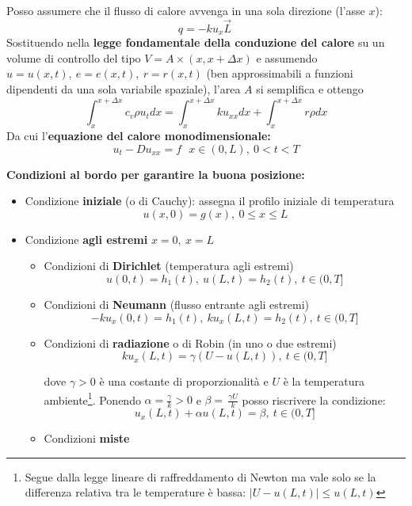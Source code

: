 \documentclass[10pt,a4paper,twoside,openright]{book}
\begin{document}
Posso assumere che il flusso di calore avvenga in una sola direzione (l'asse $\displaystyle x$):
\begin{equation*}
q=-ku_{x}\vec{L} \ 
\end{equation*}
Sostituendo nella \textbf{legge fondamentale della conduzione del calore} su un volume di controllo del tipo $\displaystyle V=A\times (x,x+\Delta x)$ e assumendo $\displaystyle u=u(x,t),\ e=e(x,t),\ r=r(x,t)$ (ben approssimabili a funzioni dipendenti da una sola variabile spaziale), l'area $\displaystyle A$ si semplifica e ottengo
\begin{equation*}
\int ^{x+\Delta x}_{x} c_{v} \rho u_{t} dx=\int ^{x+\Delta x}_{x} ku_{xx} dx+\int ^{x+\Delta x}_{x} r\rho dx
\end{equation*}
Da cui l'\textbf{equazione del calore monodimensionale:}
\begin{equation*}
\boxed{u_{t} -Du_{xx} =f} \ \ \ x\in (0,L),\ 0< t< T
\end{equation*}


\textbf{Condizioni al bordo per garantire la buona posizione:}
\begin{itemize}
\item Condizione \textbf{iniziale} (o di Cauchy): assegna il profilo iniziale di temperatura\begin{equation*}
u(x,0) =g(x),\ 0\leqslant x\leqslant L
\end{equation*}
\item Condizione \textbf{agli estremi} $\displaystyle x=0,\ x=L$
\begin{itemize}
\item Condizioni di \textbf{Dirichlet} (temperatura agli estremi)\begin{equation*}
u(0,t) =h_{1}(t),\ u(L,t) =h_{2}(t),\ t\in ( 0,T]
\end{equation*}
\item Condizioni di \textbf{Neumann} (flusso entrante agli estremi)\begin{equation*}
-ku_{x}(0,t) =h_{1}(t),\ ku_{x}(L,t) =h_{2}(t),\ t\in ( 0,T]
\end{equation*}
\item Condizioni di \textbf{radiazione} o di Robin (in uno o due estremi)\begin{equation*}
ku_{x}(L,t) =\gamma (U-u(L,t)),\ t\in ( 0,T]
\end{equation*}

dove $\displaystyle \gamma  >0$ è una costante di proporzionalità e $\displaystyle U$ è la temperatura ambiente\footnote{Segue dalla legge lineare di raffreddamento di Newton ma vale solo se la differenza relativa tra le temperature è bassa: $\displaystyle | U-u(L,t)| \leqslant u(L,t)$}. Ponendo $\displaystyle \alpha =\frac{\gamma }{k}  >0$ e $\displaystyle \beta =\frac{}{}\frac{\gamma U}{k}$ posso riscrivere la condizione:\begin{equation*}
u_{x}(L,t) +\alpha u(L,t) =\beta,\ t\in ( 0,T]
\end{equation*}
\item Condizioni \textbf{miste}
\end{itemize}
\end{itemize}
\end{document}

